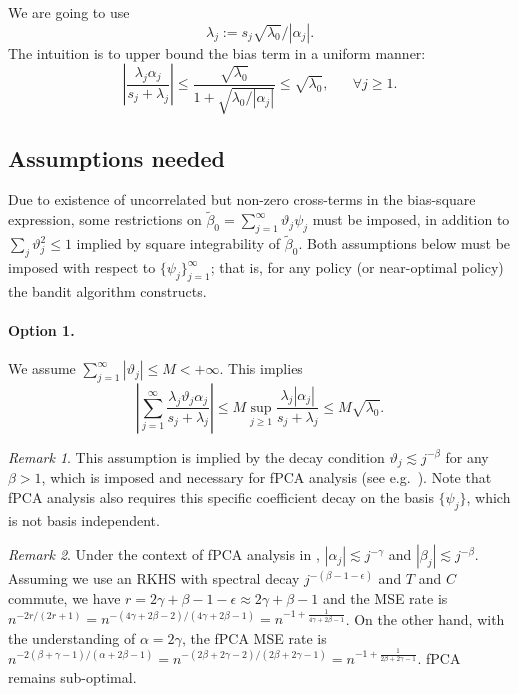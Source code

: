 \documentclass[11pt,a4paper]{article}
\renewcommand{\tilde}{\widetilde}
\theoremstyle{definition}
\theoremstyle{plain}
\theoremstyle{remark}
\newtheorem{remark}{Remark}[section]
\begin{document}
We are going to use
$$
\lambda_j := s_j\sqrt{\lambda_0}/|\alpha_j|.
$$
The intuition is to upper bound the bias term in a uniform manner:
$$
\left|\frac{\lambda_j\alpha_j}{s_j+\lambda_j}\right| \leq \frac{\sqrt{\lambda_0}}{1+\sqrt{\lambda_0/|\alpha_j|}}\leq \sqrt{\lambda_0},\;\;\;\;\;\;\forall j\geq 1.
$$

\subsection{Assumptions needed}

Due to existence of uncorrelated but non-zero cross-terms in the bias-square expression, some restrictions on $\tilde\beta_0=\sum_{j=1}^{\infty}\vartheta_j\psi_j$
must be imposed, in addition to $\sum_j\vartheta_j^2\leq 1$ implied by square integrability of $\tilde\beta_0$.
Both assumptions below must be imposed with respect to $\{\psi_j\}_{j=1}^{\infty}$; that is, for any policy (or near-optimal policy) the bandit algorithm constructs.

\paragraph{Option 1.} We assume $\sum_{j=1}^{\infty}|\vartheta_j|\leq M<+\infty$. This implies
$$
\left|\sum_{j=1}^{\infty}\frac{\lambda_j\vartheta_j\alpha_j}{s_j+\lambda_j}\right| \leq M\sup_{j\geq 1}\frac{\lambda_j|\alpha_j|}{s_j+\lambda_j} \leq M\sqrt{\lambda_0}.
$$

\begin{remark}
This assumption is implied by the decay condition $\vartheta_j\lesssim j^{-\beta}$ for any $\beta>1$, which is imposed and necessary for fPCA analysis (see e.g.~\cite{cai2006prediction}).
Note that fPCA analysis also requires this specific coefficient decay on the basis $\{\psi_j\}$, which is not basis independent.
\end{remark}

\begin{remark}
Under the context of fPCA analysis in \cite{cai2006prediction}, $|\alpha_j|\lesssim j^{-\gamma}$ and $|\beta_j|\lesssim j^{-\beta}$. Assuming we use an RKHS with spectral decay $j^{-(\beta-1-\epsilon)}$
and $T$ and $C$ commute, we have $r=2\gamma+\beta-1-\epsilon\approx 2\gamma+\beta-1$ and the MSE rate is $n^{-2r/(2r+1)} = n^{-(4\gamma+2\beta-2)/(4\gamma+2\beta-1)} = n^{-1+\frac{1}{4\gamma+2\beta-1}}$.
On the other hand, with the understanding of $\alpha=2\gamma$, the fPCA MSE rate is $n^{-2(\beta+\gamma-1)/(\alpha+2\beta-1)} = n^{-(2\beta+2\gamma-2)/(2\beta+2\gamma-1)}=n^{-1+\frac{1}{2\beta+2\gamma-1}}$.
fPCA remains sub-optimal.
\end{remark}
\end{document}
